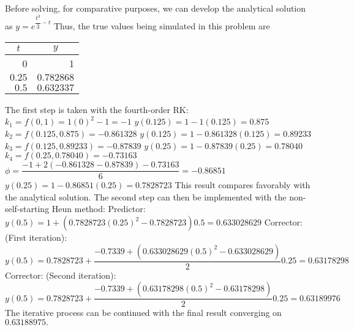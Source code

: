 \documentclass[../main.tex]{subfiles}
\begin{document}
\section{}
Before solving, for comparative purposes, we can develop the analytical solution as
	\bigbreak
$y=e^{\dfrac{t^{3}}{3}-t}$
	\bigbreak
Thus, the true values being simulated in this problem are
	\bigbreak
\begin{tabular}{rr}
\hline
\multicolumn{1}{c}{$t$} & \multicolumn{1}{c}{$y$} \\
\hline
0 & 1 \\
$0.25$ & $0.782868$ \\
$0.5$ & $0.632337$ \\
\hline
\end{tabular}
	\bigbreak
The first step is taken with the fourth-order RK:
	\bigbreak
$k_{1}=f(0,1)=1(0)^{2}-1=-1$
	\bigbreak
$y(0.125)=1-1(0.125)=0.875$
	\bigbreak 
$k_{2}=f(0.125,0.875)=-0.861328$
	\bigbreak 
$y(0.125)=1-0.861328(0.125)=0.89233$
	\bigbreak
$k_{3}=f(0.125,0.89233)=-0.87839$
	\bigbreak
$y(0.25)=1-0.87839(0.25)=0.78040$
	\bigbreak
$k_{4}=f(0.25,0.78040)=-0.73163$
	\bigbreak
$\phi=\dfrac{-1+2(-0.861328-0.87839)-0.73163}{6}=-0.86851$
	\bigbreak
$y(0.25)=1-0.86851(0.25)=0.7828723$
	\bigbreak
This result compares favorably with the analytical solution.
	\bigbreak
The second step can then be implemented with the non-self-starting Heun method:
	\bigbreak
Predictor:
	\bigbreak
$y(0.5)=1+\left(0.7828723(0.25)^{2}-0.7828723\right) 0.5=0.633028629$
	\bigbreak
Corrector: (First iteration):
	\bigbreak
$y(0.5)=0.7828723+\dfrac{-0.7339+\left(0.633028629(0.5)^{2}-0.633028629\right)}{2} 0.25=0.63178298$
	\bigbreak
Corrector: (Second iteration):
	\bigbreak
$y(0.5)=0.7828723+\dfrac{-0.7339+\left(0.63178298(0.5)^{2}-0.63178298\right)}{2} 0.25=0.63189976$
	\bigbreak
The iterative process can be continued with the final result converging on $0.63188975 .$
\end{document}
